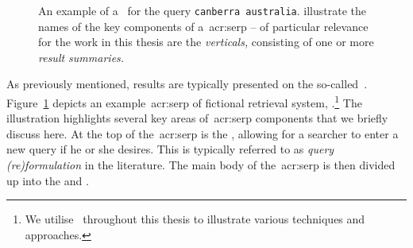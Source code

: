 \begin{figure}[t!]
    \centering
    \caption[Example of a~\gls{acr:serp}]{An example of a~ for the query \texttt{canberra australia}.  illustrate the names of the key components of a~\gls{acr:serp} -- of particular relevance for the work in this thesis are the \emph{verticals,} consisting of one or more \emph{result summaries.}}
    \label{fig:serp_example}
\end{figure}

As previously mentioned, results are typically presented on the so-called~. Figure~\ref{fig:serp_example} depicts an example~\gls{acr:serp} of fictional retrieval system, \searchlogo.\footnote{We utilise \searchlogo~throughout this thesis to illustrate various techniques and approaches.} The illustration highlights several key areas of~\gls{acr:serp} components that we briefly discuss here. At the top of the~\gls{acr:serp} is the , allowing for a searcher to enter a new query if he or she desires. This is typically referred to as \emph{query (re)formulation} in the literature. The main body of the~\gls{acr:serp} is then divided up into the  and .

